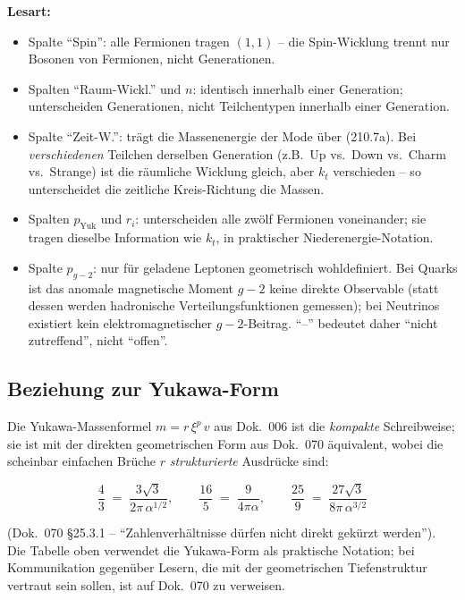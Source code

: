 \textbf{Lesart:}
\begin{itemize}
  \item Spalte \enquote{Spin}: alle Fermionen tragen $(1,1)$ -- die
        Spin-Wicklung trennt nur Bosonen von Fermionen, nicht
        Generationen.
  \item Spalten \enquote{Raum-Wickl.} und $n$: identisch innerhalb
        einer Generation; unterscheiden Generationen, nicht
        Teilchentypen innerhalb einer Generation.
  \item Spalte \enquote{Zeit-W.}: trägt die Massenenergie der Mode
        über (210.7a). Bei \emph{verschiedenen} Teilchen derselben
        Generation (z.B.\ Up vs.\ Down vs.\ Charm vs.\ Strange) ist
        die räumliche Wicklung gleich, aber $k_t$ verschieden -- so
        unterscheidet die zeitliche Kreis-Richtung die Massen.
  \item Spalten $p_{\text{Yuk}}$ und $r_i$: unterscheiden alle zwölf
        Fermionen voneinander; sie tragen dieselbe Information wie
        $k_t$, in praktischer Niederenergie-Notation.
  \item Spalte $p_{g\!-\!2}$: nur für geladene Leptonen geometrisch
        wohldefiniert. Bei Quarks ist das anomale magnetische Moment
        $g\!-\!2$ keine direkte Observable (statt dessen werden
        hadronische Verteilungsfunktionen gemessen); bei Neutrinos
        existiert kein elektromagnetischer $g\!-\!2$-Beitrag. \enquote{--}
        bedeutet daher \enquote{nicht zutreffend}, nicht \enquote{offen}.
\end{itemize}

\subsection*{Beziehung zur Yukawa-Form}

Die Yukawa-Massenformel $m = r\,\xi^p\,v$ aus Dok.~006 ist die
\emph{kompakte} Schreibweise; sie ist mit der direkten geometrischen
Form aus Dok.~070 äquivalent, wobei die scheinbar einfachen Brüche
$r$ \emph{strukturierte} Ausdrücke sind:

\begin{equation}
  \frac{4}{3} \;=\; \frac{3\sqrt{3}}{2\pi\,\alpha^{1/2}},
  \qquad
  \frac{16}{5} \;=\; \frac{9}{4\pi\alpha},
  \qquad
  \frac{25}{9} \;=\; \frac{27\sqrt{3}}{8\pi\,\alpha^{3/2}}
  \tag{210.8}
\end{equation}

(Dok.~070 §25.3.1 -- \enquote{Zahlenverhältnisse dürfen nicht direkt
gekürzt werden}). Die Tabelle oben verwendet die Yukawa-Form als
praktische Notation; bei Kommunikation gegenüber Lesern, die mit der
geometrischen Tiefenstruktur vertraut sein sollen, ist auf Dok.~070
zu verweisen.

